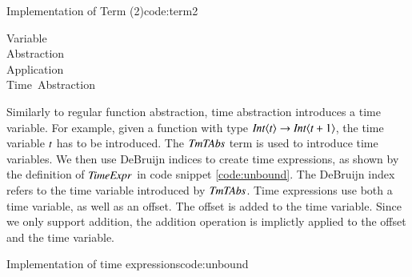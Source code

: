 \begin{texexptitled}{Implementation of Term (2)}{code:term2}
\begin{hscode}\SaveRestoreHook
{}%
%
%
%
%
%
\>[B]{}\;\<[13]%
\>[13]{}\mathrel{=}{}\<[13E]%
\>[17]{}\;\<[37]%
\>[37]{}\mbox{\onelinecomment  Variable}{}\<[E]%
\\
\>[13]{}\mid {}\<[13E]%
\>[17]{}\;\;\<[37]%
\>[37]{}\mbox{\onelinecomment  Abstraction }{}\<[E]%
\\
\>[13]{}\mid {}\<[13E]%
\>[17]{}\;\;\<[37]%
\>[37]{}\mbox{\onelinecomment  Application }{}\<[E]%
\\
\>[13]{}\mid {}\<[13E]%
\>[17]{}\;\;\<[37]%
\>[37]{}\mbox{\onelinecomment  Time Abstraction}{}\<[E]%
\ColumnHook
\end{hscode}\resethooks
\end{texexptitled}

Similarly to regular function abstraction, time abstraction introduces a time variable.
For example, given a function with type \ensuremath{\Conid{Int}\langle\Varid{t}\rangle\to \Conid{Int}\langle\Varid{t}\mathbin{+}\mathrm{1}\rangle}, the time variable \ensuremath{\Varid{t}} has to be introduced.
The \ensuremath{\Conid{TmTAbs}} term is used to introduce time variables.
We then use DeBruijn indices to create time expressions, as shown by the definition of \ensuremath{\Conid{TimeExpr}} in code snippet \ref{code:unbound}.
The DeBruijn index refers to the time variable introduced by \ensuremath{\Conid{TmTAbs}}.
Time expressions use both a time variable, as well as an offset.
The offset is added to the time variable. 
Since we only support addition, the addition operation is implictly applied to the offset and the time variable.

\begin{texexptitled}{Implementation of time expressions}{code:unbound}
\begin{hscode}\SaveRestoreHook
{}%
%
%
%
%
\>[B]{}\;\<[17]%
\>[17]{}\mathrel{=}{}\<[17E]%
\>[21]{}\;\;\<[E]%
\\
\>[17]{}\mid {}\<[17E]%
\>[21]{}\;\<[E]%
\\[\blanklineskip]%
\>[B]{}\;\mathrel{=}\;\;\<[E]%
\\[\blanklineskip]%
\>[B]{}\;\mathrel{=}\<[E]%
\ColumnHook
\end{hscode}\resethooks
\end{texexptitled}

